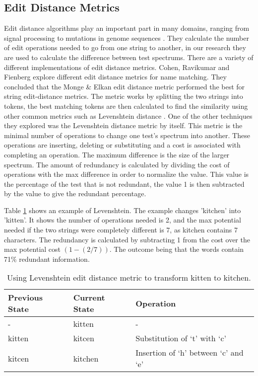 \subsection{Edit Distance Metrics}
\label{editdistbg}
Edit distance algorithms play an important part in many domains, ranging from signal processing to mutations in genome sequences \cite{navarro2001guided}. They calculate the number of edit operations needed to go from one string to another, in our research they are used to calculate the difference between test spectrums. There are a variety of different implementations of edit distance metrics. Cohen, Ravikumar and Fienberg \cite{cohen2003comparison} explore different edit distance metrics for name matching. They concluded that the Monge \& Elkan edit distance metric \cite{monge1997efficient} performed the best for string edit-distance metrics. The metric works by splitting the two strings into tokens, the best matching tokens are then calculated to find the similarity using other common metrics such as Levenshtein distance \cite{levenshtein1966binary}. One of the other techniques they explored was the Levenshtein distance metric by itself. This metric is the minimal number of operations to change one test's spectrum into another. These operations are inserting, deleting or substituting and a cost is associated with completing an operation. The maximum difference is the size of the larger spectrum. The amount of redundancy is calculated by dividing the cost of operations with the max difference in order to normalize the value. This value is the percentage of the test that is not redundant, the value 1 is then subtracted by the value to give the redundant percentage.

Table \ref{levenTable} shows an example of Levenshtein. The example changes 'kitchen' into 'kitten'. It shows the number of operations needed is 2, and the max potential needed if the two strings were completely different is 7, as kitchen contains 7 characters. The redundancy is calculated by subtracting 1 from the cost over the max potential cost $(1 - (2/7)) $. The outcome being that the words contain 71\% redundant information. 

\begin{table}[H]
\centering

\begin{tabular}{|l|l|l|}
\hline
{\bf Previous State} & {\bf Current State} & {\bf Operation}                      \\ \hline
-                    & kitten              & -                                    \\ \hline
kitten               & kitcen              & Substitution of `t' with `c'         \\ \hline
kitcen               & kitchen             & Insertion of `h' between `c' and `e' \\ \hline
\end{tabular}
\caption{Using Levenshtein edit distance metric to transform kitten to kitchen.}
\label{levenTable}
\end{table}

